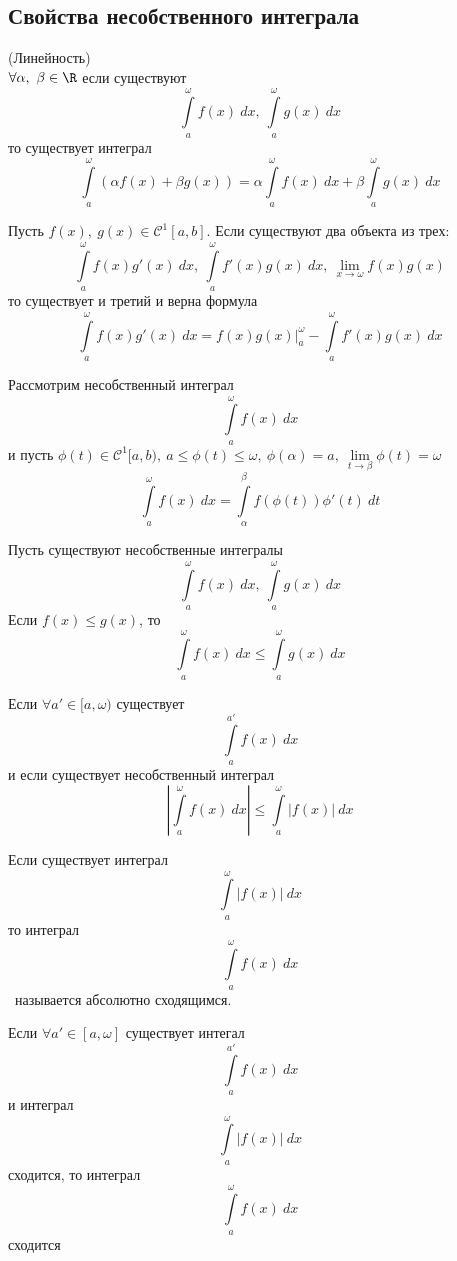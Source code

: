 \subsection{Свойства несобственного интеграла}
\setcounter{thmcount}{0}
\begin{numtheorem}
    (Линейность)\\
    $\forall \alpha,\ \beta\in \R$ если существуют
    \[\int\limits_{a}^{\omega}f(x)\ dx,\ \int\limits_{a}^{\omega}g(x)\ dx\]
    то существует интеграл
    \[\int\limits_{a}^{\omega}(\alpha f(x)+\beta g(x))=\alpha \int\limits_{a}^{\omega}f(x)\ dx+\beta \int\limits_{a}^{\omega}g(x)\ dx\]
\end{numtheorem}
\begin{numtheorem}
    Пусть $f(x),\ g(x)\in \mathcal{C}^1[a,b]$. Если существуют два объекта из трех:
    \[\int\limits_{a}^{\omega} f(x)g'(x)\ dx,\ \int\limits_{a}^{\omega}f'(x)g(x)\ dx,\ \lim\limits_{x\to \omega}f(x)g(x)\]
    то существует и третий и верна формула
    \[\int\limits_{a}^{\omega}f(x)g'(x)\ dx=f(x)g(x)|_a^{\omega}-\int\limits_{a}^{\omega}f'(x)g(x)\ dx\]
\end{numtheorem}  
\begin{numtheorem}
    Рассмотрим несобственный интеграл 
    \[\int\limits_{a}^{\omega}f(x)\ dx\]
    и пусть $\phi(t)\in \mathcal{C}^1[a,b),\ a\leq \phi(t)\leq \omega,\ \phi(\alpha)=a,\ \lim\limits_{t\to \beta}\phi(t)=\omega$
    \[\int\limits_{a}^{\omega}f(x)\ dx=\int\limits_{\alpha}^{\beta} f(\phi(t))\phi'(t)\ dt\]
\end{numtheorem} 
\begin{numtheorem}
    Пусть существуют несобственные интегралы
    \[\int\limits_{a}^{\omega}f(x)\ dx,\ \int\limits_{a}^{\omega}g(x)\ dx\]
    Если $f(x)\leq g(x)$, то
    \[\int\limits_{a}^{\omega}f(x)\ dx\leq \int\limits_{a}^{\omega}g(x)\ dx\]
\end{numtheorem} 
\begin{numtheorem}
    Если $\forall a'\in [a, \omega)$ существует
    \[\int\limits_{a}^{a'}f(x)\ dx\]
    и если существует несобственный интеграл
    \[\left|\int\limits_{a}^{\omega}f(x)\ dx\right|\leq \int\limits_{a}^{\omega}|f(x)|\ dx\]
\end{numtheorem} 
\begin{definition}
    Если существует интеграл
    \[\int\limits_{a}^{\omega}|f(x)|\ dx\]
    то интеграл
    \[\int\limits_{a}^{\omega}f(x)\ dx\]\
    называется абсолютно сходящимся.
\end{definition} 
\begin{statement}
    Если $\forall a'\in [a, \omega]$ существует интегал
    \[\int\limits_{a}^{a'}f(x)\ dx\]
    и интеграл
    \[\int\limits_{a}^{\omega}|f(x)|\ dx\]
    сходится, то интеграл
    \[\int\limits_{a}^{\omega}f(x)\ dx\]
    сходится
\end{statement} 

